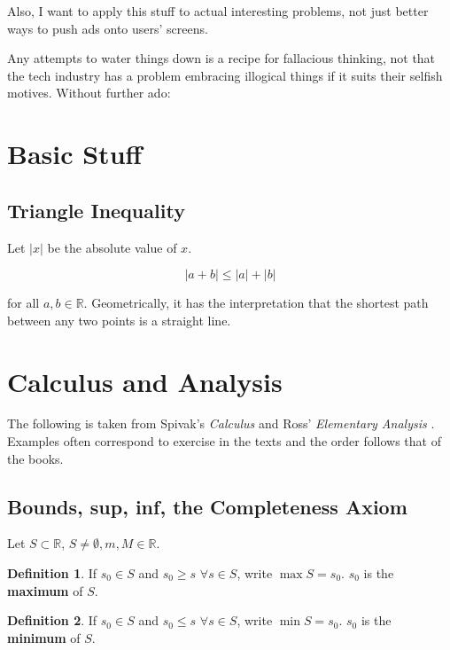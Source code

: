 \documentclass{article}
\theoremstyle{definition}
\newtheorem{definition}{Definition}
\begin{document}
Also, I want to apply this stuff to actual interesting problems, not just better ways to push ads onto users' screens.

Any attempts to water things down is a recipe for fallacious thinking, not that the tech industry has a problem embracing illogical things if it suits their selfish motives. Without further ado:

\section{Basic Stuff}

\subsection{Triangle Inequality}
Let $|x|$ be the absolute value of $x$.

\begin{equation} \label{triangle-inequality}
|a + b| \leq |a| + |b| 
\end{equation}

for all $a, b \in \mathbb{R}$. Geometrically, it has the interpretation that the shortest path between any two points is a straight line.

\section{Calculus and Analysis}

The following is taken from Spivak's {\it Calculus} \cite{spivak} and Ross' {\it Elementary Analysis} \cite{ross}. Examples often correspond to exercise in the texts and the order follows that of the books.

\subsection{Bounds, sup, inf, the Completeness Axiom}

Let $S \subset \mathbb{R}$, $S \neq \emptyset, m, M \in \mathbb{R}$. 

\begin{definition}
If $s_0 \in S$ and $s_0 \ge s$ $\forall s \in S$, write $\max S = s_0$. $s_0$ is the \textbf{maximum} of $S$.
\end{definition}

\begin{definition}
If $s_0 \in S$ and $s_0 \le s$ $\forall s \in S$, write $\min S = s_0$. $s_0$ is the \textbf{minimum} of $S$.
\end{definition}
\end{document}
